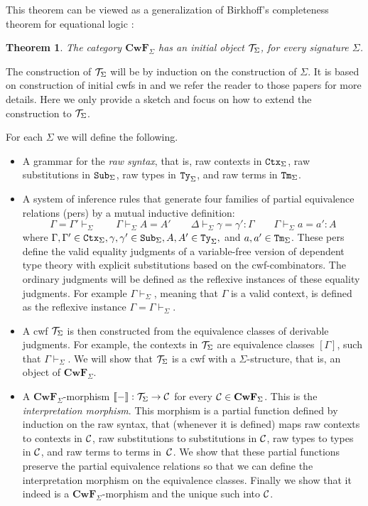 \documentclass{lmcs}
\newtheorem{theorem}{Theorem}
\def\Cwf{\mathbf{CwF}}
\begin{document}
This theorem can be viewed as a generalization of Birkhoff's completeness theorem for equational logic \cite{birkhoff}:
\begin{theorem}\label{initial-gat}
The category $\Cwf_\Sigma$ has an initial object ${\mathcal T}_\Sigma$,
for every signature $\Sigma$.
\end{theorem}

The construction of ${\mathcal T}_\Sigma$ will be by induction on the construction of $\Sigma$. It is based on construction of initial cwfs in \cite{castellan:tlca2015,castellan:lmcs} and we refer the reader to those papers for more details. Here we only provide a sketch and focus on how to extend the construction to ${\mathcal T}_\Sigma$.

For each $\Sigma$ we will define the following.
\begin{itemize}
\item
A grammar for the {\em raw syntax}, that is, raw contexts in ${\tt Ctx}_\Sigma$, raw substitutions in ${\tt Sub}_\Sigma$, raw types in ${\tt Ty}_\Sigma$, and raw terms in ${\tt Tm}_\Sigma$.
\item
A system of inference rules that generate four families of partial equivalence relations (pers) by a mutual inductive definition:
$$
\Gamma = \Gamma' \vdash_\Sigma
\qquad
\Gamma \vdash_\Sigma A = A'
\qquad
\Delta \vdash_\Sigma \gamma = \gamma' : \Gamma
\qquad
\Gamma \vdash_\Sigma a = a' : A
$$
where $\Gamma, \Gamma' \in {\tt Ctx}_\Sigma, \gamma, \gamma' \in {\tt Sub}_\Sigma, A, A' \in {\tt Ty}_\Sigma,$ and $a,a' \in {\tt Tm}_\Sigma$. These pers define the valid equality judgments of a variable-free version of dependent type theory with explicit substitutions based on the cwf-combinators. The ordinary judgments will be defined as the reflexive instances of these equality judgments. For example $\Gamma \vdash_\Sigma$, meaning that $\Gamma$ is a valid context, is defined as the reflexive instance $\Gamma = \Gamma \vdash_\Sigma$.
\item
A cwf ${\mathcal T}_\Sigma$ is then constructed from the equivalence classes of derivable judgments. For example, the contexts in ${\mathcal T}_\Sigma$ are equivalence classes $[\Gamma]$, such that $\Gamma \vdash_\Sigma$. We will show that ${\mathcal T}_\Sigma$ is a cwf with a $\Sigma$-structure, that is, an object of $\Cwf_\Sigma$.
\item
A $\Cwf_\Sigma$-morphism $\llbracket - \rrbracket : {\mathcal T}_\Sigma \to {\mathcal C}$ for every $\C \in \Cwf_\Sigma$. This is the {\em interpretation morphism}. This morphism is a partial function defined by induction on the raw syntax, that (whenever it is defined) maps raw contexts to contexts in ${\mathcal C}$, raw substitutions to substitutions in ${\mathcal C}$, raw types to types in ${\mathcal C}$, and raw terms to terms in~${\mathcal C}$. We show that these partial functions preserve the partial equivalence relations so that we can define the interpretation morphism on the equivalence classes. Finally we show that it indeed is a $\Cwf_\Sigma$-morphism and the unique such into ${\mathcal C}$.
\end{itemize}
\end{document}
